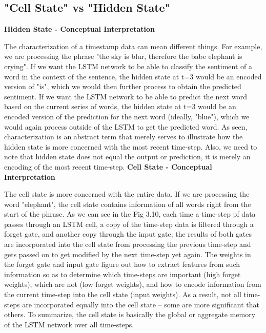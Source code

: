 \subsection{"Cell State" vs "Hidden State"}
				\textbf{Hidden State - Conceptual Interpretation}

The characterization of a timestamp data can mean different things. For example, we are processing the phrase "the sky is blur, therefore the babe elephant is crying". If we want the LSTM network to be able to classify the sentiment of a word in the context of the sentence, the hidden state at t=3 would be an encoded version of "is", which we would then further process to obtain the predicted sentiment. If we want the LSTM network to be able to predict the next word based on the current series of words, the hidden state at t=3 would be an encoded version of the prediction for the next word (ideally, "blue"), which we would again process outside of the LSTM to get the predicted word. As seen, characterization is an abstract term that merely serves to illustrate how the hidden state is more concerned with the most recent time-step. Also, we need to note that hidden state does not equal the output or prediction, it is merely an encoding of the most recent time-step.
\textbf{Cell State - Conceptual Interpretation}

The cell state is more concerned with the entire data. If we are processing the word "elephant", the cell state contains information of all words right from the start of the phrase. As we can see in the Fig 3.10, each time a time-step pf data passes through an LSTM cell, a copy of the time-step data is filtered through a forget gate, and another copy through the input gate; the results of both gates are incorporated into the cell state from processing the previous time-step and gets passed on to get modified by the next time-step yet again. The weights in the forget gate and input gate figure out how to extract features from such information so as to determine which time-steps are important (high forget weights), which are not (low forget weights), and how to encode information from the current time-step into the cell state (input weights). As a result, not all time-steps are incorporated equally into the cell state -- some are more significant that others. 
To summarize, the cell state is basically the global or aggregate memory of the LSTM network over all time-steps.



